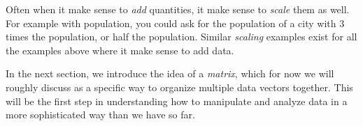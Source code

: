 \documentclass{ximera}
\begin{document}
\begin{exploration}
\begin{example}
\end{example}

Often when it make sense to \textit{add} quantities, it make sense to
\textit{scale} them as well. For example with population, you could
ask for the population of a city with $3$ times the population, or
half the population. Similar \textit{scaling} examples exist for all
the examples above where it make sense to add data.

\end{exploration}

In the next section, we introduce the idea of a \emph{matrix}, which for now we will roughly discuss as a specific way to organize multiple data vectors together. This will be the first step in understanding how to manipulate and analyze data in a more sophisticated way than we have so far.
\end{document}
